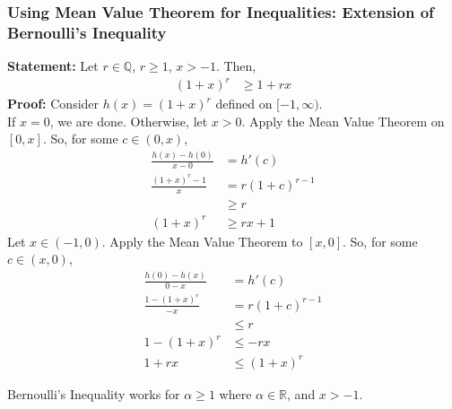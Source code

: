 \documentclass[10pt]{extarticle}
\newcommand{\Q}{\mathbb{Q}}
\newcommand{\R}{\mathbb{R}}
\begin{document}
  \subsubsection{Using Mean Value Theorem for Inequalities: Extension of Bernoulli's Inequality}%
  \textbf{Statement:} Let $r \in \Q$, $r \geq 1$, $x > -1$. Then,
  \begin{align*}
    (1+x)^{r} &\geq 1 + rx
  \end{align*}
  \textbf{Proof:} Consider $h(x) = (1+x)^{r}$ defined on $[-1,\infty)$.\\
  If $x = 0$, we are done. Otherwise, let $x > 0$. Apply the Mean Value Theorem on $[0,x]$. So, for some $c\in (0,x)$,
  \begin{align*}
    \frac{h(x)-h(0)}{x-0} &= h'(c)\\
    \frac{(1+x)^r-1}{x} &= r(1+c)^{r-1}\\
                        &\geq r\\
    (1+x)^{r} &\geq rx +1
  \end{align*}
  Let $x\in (-1,0)$. Apply the Mean Value Theorem to $[x,0]$. So, for some $c\in (x,0)$,
  \begin{align*}
    \frac{h(0)-h(x)}{0-x} &= h'(c)\\
    \frac{1-(1+x)^r}{-x} &= r(1+c)^{r-1}\\
                         &\leq r\\
    1-(1+x)^r &\leq -rx\\
    1+rx &\leq (1+x)^{r}
  \end{align*}
  \begin{description}
    \small
    \item[Remark:] Bernoulli's Inequality works for $\alpha \geq 1$ where $\alpha\in\R$, and $x > -1$.
  \end{description}
\end{document}

